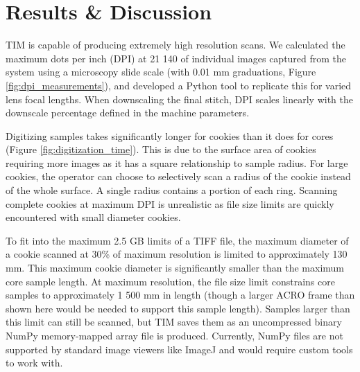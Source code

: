 \documentclass[a4paper,12pt]{article}
\begin{document}
\section{Results \& Discussion} 



TIM is capable of producing extremely high resolution scans. We calculated the maximum dots per inch (DPI) at 21 140 of individual images captured from the system using a microscopy slide scale (with 0.01 mm graduations, Figure \ref{fig:dpi_measurements}), and developed a Python tool to replicate this for varied lens focal lengths. When downscaling the final stitch, 
DPI scales linearly with the downscale percentage defined in the machine parameters. 

Digitizing samples takes significantly longer for cookies than it does for cores (Figure \ref{fig:digitization_time}). This is due to the surface area of cookies requiring more images as it has a square relationship to sample radius.
For large cookies, the operator can choose to selectively scan a radius of the cookie instead of the whole surface. A single radius contains a portion of each ring. Scanning complete cookies at maximum DPI is unrealistic as file size limits are quickly encountered with small diameter cookies. 

To fit into the maximum 2.5 GB limits of a TIFF file, the maximum diameter of a cookie scanned at 30\% of maximum resolution is limited to approximately 130 mm. This maximum cookie diameter is significantly smaller than the maximum core sample length. At maximum resolution, the file size limit 
constrains core samples to approximately 1 500 mm in length (though a larger ACRO frame than shown here would be needed to support this sample length). Samples larger than this limit can still be scanned, but TIM saves them as an uncompressed binary NumPy memory-mapped array file is produced. Currently, NumPy files are not supported by standard image viewers like ImageJ and would require custom tools to work with. %
\end{document}
